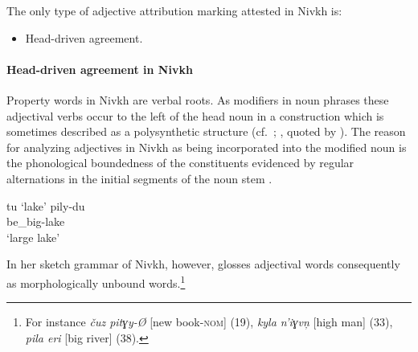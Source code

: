 The only type of adjective attribution marking attested in Nivkh is:
\begin{itemize}
\item Head-driven agreement.
\end{itemize}

\paragraph{Head-driven agreement in Nivkh}
\noindent Property words in Nivkh are verbal roots. As modifiers in noun phrases these adjectival verbs occur to the left of the head noun in a construction which is sometimes described as a polysynthetic structure (cf.~\citealt[16]{gruzdeva1998}; \citealt[80]{jakobson1971}, quoted by \citealt[138]{rijkhoff2002}). The reason for analyzing adjectives in Nivkh as being incorporated into the modified noun is the phonological boundedness of the constituents evidenced by regular alternations in the initial segments of the noun stem \cite[16]{gruzdeva1998}.
\begin{exe}
\ex {}
\begin{xlist}
\ex tu ‘lake’
\ex 
\gll	pily-du\\
	be\_big-lake\\
\glt	‘large lake’
\end{xlist}
\end{exe}
In her sketch grammar of Nivkh, however, \cite{gruzdeva1998} glosses adjectival words consequently as morphologically unbound words.\footnote{For instance \textit{čuz pitɣy-Ø} [new book-\textsc{nom}] (19), \textit{kyla n'iɣvn̦} [high man] (33), \textit{pila eri} [big river] (38).}

